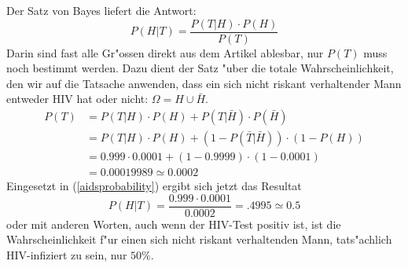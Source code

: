 Der Satz von Bayes liefert die Antwort:
\begin{equation}
P(H|T)=\frac{P(T|H)\cdot P(H)}{P(T)}
\label{aidsprobability}
\end{equation}
Darin sind fast alle Gr"ossen direkt aus dem Artikel ablesbar, nur $P(T)$ muss
noch bestimmt werden. Dazu dient der Satz "uber die totale Wahrscheinlichkeit,
den wir auf die Tatsache anwenden, dass ein sich nicht riskant verhaltender
Mann entweder HIV hat oder nicht: $\Omega=H\cup \bar H$.
\begin{align*}
P(T)
&=P(T|H)\cdot P(H)+P(T|\bar H)\cdot P(\bar H)\\
&=P(T|H)\cdot P(H)+(1-P(\bar T|\bar H))\cdot (1 - P(H))\\
&=0.999\cdot 0.0001+(1-0.9999)\cdot(1-0.0001)\\
&=0.00019989\simeq 0.0002
\end{align*}
Eingesetzt in (\ref{aidsprobability}) ergibt sich jetzt das Resultat
\[
P(H|T)=\frac{0.999\cdot 0.0001}{0.0002}=.4995\simeq 0.5
\]
oder mit anderen Worten, auch wenn der HIV-Test positiv ist, ist
die Wahrscheinlichkeit f"ur einen sich nicht riskant verhaltenden Mann,
tats"achlich HIV-infiziert zu sein, nur $50\%$.


